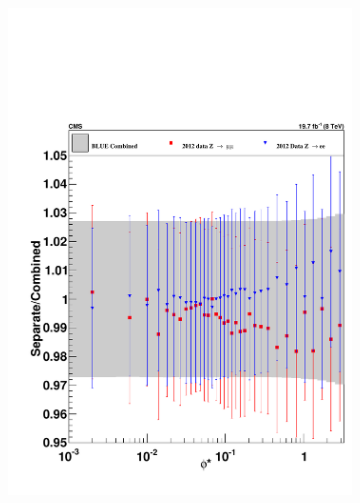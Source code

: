 \begin{figure}
    \centering
    \begin{subfigure}[b]{0.49\textwidth}
    \includegraphics[width=\linewidth]{figures/Results/BlueOneDAbs.pdf}
    \end{subfigure}
     \begin{subfigure}[b]{0.49\textwidth}

\end{subfigure}
\end{figure}
